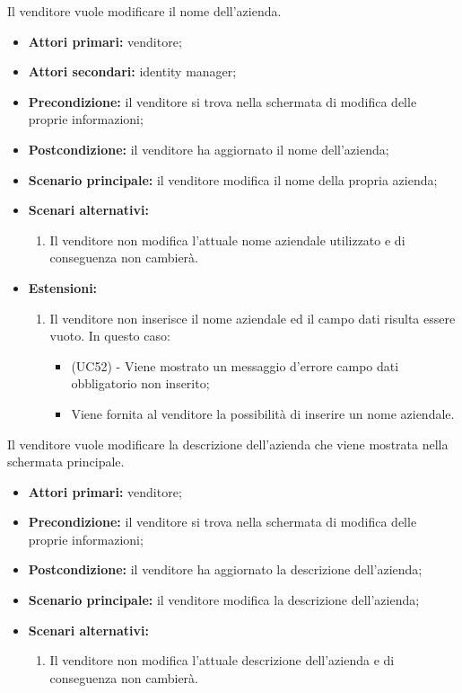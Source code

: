 Il venditore vuole modificare il nome dell'azienda.
\begin{itemize}
	\item \textbf{Attori primari:} venditore;
	\item \textbf{Attori secondari:} identity manager;
	\item \textbf{Precondizione:} il venditore si trova nella schermata di modifica delle proprie informazioni;
	\item \textbf{Postcondizione:} il venditore ha aggiornato il nome dell'azienda;
	\item \textbf{Scenario principale:} il venditore modifica il nome della propria azienda;
	\item \textbf{Scenari alternativi:}
	\begin{enumerate}[label=\lett]
		\item Il venditore non modifica l'attuale nome aziendale utilizzato e di conseguenza non cambierà.
	\end{enumerate}
	\item \textbf{Estensioni:}
	\begin{enumerate}[label=\lett]
		\item Il venditore non inserisce il nome aziendale ed il campo dati risulta essere vuoto. In questo caso:
		\begin{itemize}
			\item (UC52) - Viene mostrato un messaggio d'errore campo dati obbligatorio non inserito;
			\item Viene fornita al venditore la possibilità di inserire un nome aziendale.
		\end{itemize}
	\end{enumerate} 
\end{itemize}

Il venditore vuole modificare la descrizione dell'azienda che viene mostrata nella schermata principale.
\begin{itemize}
    \item \textbf{Attori primari:} venditore;
    \item \textbf{Precondizione:} il venditore si trova nella schermata di modifica delle proprie informazioni;
    \item \textbf{Postcondizione:} il venditore ha aggiornato la descrizione dell'azienda;
    \item \textbf{Scenario principale:} il venditore modifica la descrizione dell'azienda;
    \item \textbf{Scenari alternativi:}
    \begin{enumerate}[label=\lett]
    	\item Il venditore non modifica l'attuale descrizione dell'azienda e di conseguenza non cambierà.
    \end{enumerate}
\end{itemize}